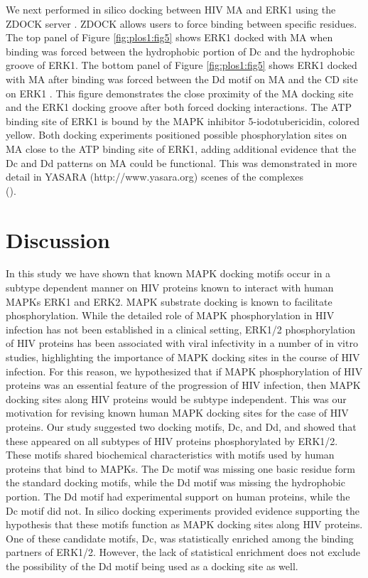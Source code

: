 We next performed in silico docking between HIV MA and ERK1 using the
ZDOCK server \cite{chen03}. ZDOCK allows users to force binding
between specific residues. The top panel of Figure
\ref{fig:plos1:fig5} shows ERK1 docked with MA when binding was forced
between the hydrophobic portion of Dc and the hydrophobic groove of
ERK1. The bottom panel of Figure \ref{fig:plos1:fig5} shows ERK1
docked with MA after binding was forced between the Dd motif on MA and
the CD site on ERK1 \cite{kinoshita08}. This figure demonstrates the
close proximity of the MA docking site and the ERK1 docking groove
after both forced docking interactions. The ATP binding site of ERK1 is bound by
the MAPK inhibitor 5-iodotubericidin, colored yellow. Both docking
experiments positioned possible phosphorylation sites on MA close to
the ATP binding site of ERK1, adding additional evidence that the Dc
and Dd patterns on MA could be functional. This was demonstrated in
more detail in YASARA (http://www.yasara.org) scenes of the complexes
\\ ().

\section{Discussion}

In this study we have shown that known MAPK docking motifs occur in a
subtype dependent manner on HIV proteins known to interact with human
MAPKs ERK1 and ERK2. MAPK substrate docking is known to facilitate
phosphorylation. While the detailed role of MAPK phosphorylation in
HIV infection has not been established in a clinical setting, ERK1/2
phosphorylation of HIV proteins has been associated with viral
infectivity in a number of in vitro studies, highlighting the
importance of MAPK docking sites in the course of HIV infection. For
this reason, we hypothesized that if MAPK phosphorylation of HIV
proteins was an essential feature of the progression of HIV infection,
then MAPK docking sites along HIV proteins would be subtype
independent. This was our motivation for revising known human MAPK
docking sites for the case of HIV proteins.  Our study suggested two
docking motifs, Dc, and Dd, and showed that these appeared on all
subtypes of HIV proteins phosphorylated by ERK1/2. These motifs shared
biochemical characteristics with motifs used by human proteins that
bind to MAPKs. The Dc motif was missing one basic residue form the
standard docking motifs, while the Dd motif was missing the
hydrophobic portion. The Dd motif had experimental support on human
proteins, while the Dc motif did not. In silico docking experiments
provided evidence supporting the hypothesis that these motifs function
as MAPK docking sites along HIV proteins. One of these candidate
motifs, Dc, was statistically enriched among the binding partners of
ERK1/2. However, the lack of statistical enrichment does not exclude
the possibility of the Dd motif being used as a docking site as well.

